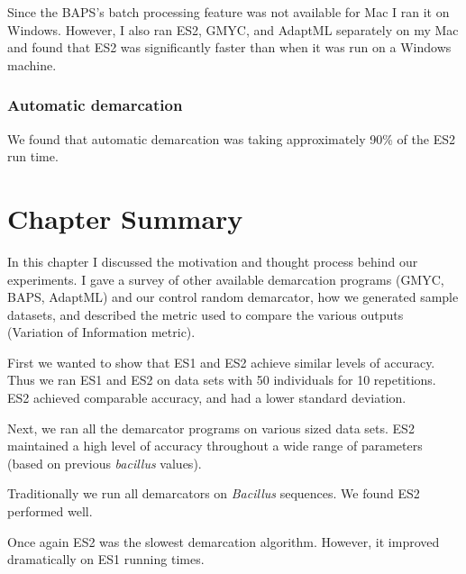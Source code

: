 Since the BAPS's batch processing feature was not available for Mac I ran it on Windows.
However, I also ran ES2, GMYC, and AdaptML separately on my Mac and found that ES2 was significantly faster than when it was run on a Windows machine.

\subsubsection*{Automatic demarcation}
We found that automatic demarcation was taking approximately 90\% of the ES2 run time.

\section{Chapter Summary}
In this chapter I discussed the motivation and thought process behind our experiments.
I gave a survey of other available demarcation programs (GMYC, BAPS, AdaptML) and our control random demarcator, how we generated sample datasets, and described the metric used to compare the various outputs (Variation of Information metric).

First we wanted to show that ES1 and ES2 achieve similar levels of accuracy.
Thus we ran ES1 and ES2 on data sets with 50 individuals for 10 repetitions.
ES2 achieved comparable accuracy, and had a lower standard deviation.

Next, we ran all the demarcator programs on various sized data sets.
ES2 maintained a high level of accuracy throughout a wide range of parameters (based on previous \emph{bacillus} values).

Traditionally we run all demarcators on \emph{Bacillus} sequences.
We found ES2 performed well.

Once again ES2 was the slowest demarcation algorithm.
However, it improved dramatically on ES1 running times.


